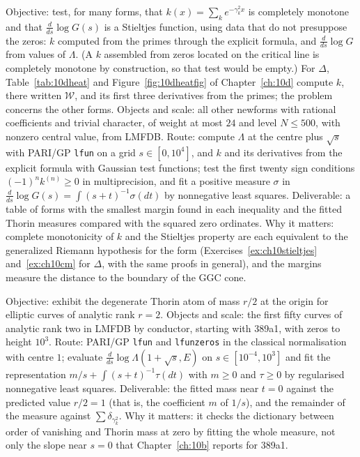 \begin{compproblem}
Objective: test, for many forms, that $k(x) = \sum_ke^{-\gamma_k^2x}$ is completely monotone and that $\frac{d}{ds}\log G(s)$ is a Stieltjes function, using data that do not presuppose the zeros: $k$ computed from the primes through the explicit formula, and $\frac{d}{ds}\log G$ from values of $\Lambda$. (A $k$ assembled from zeros located on the critical line is completely monotone by construction, so that test would be empty.) For $\Delta$, Table~\ref{tab:10dheat} and Figure~\ref{fig:10dheatfig} of Chapter~\ref{ch:10d} compute $k$, there written $\mathcal W$, and its first three derivatives from the primes; the problem concerns the other forms. Objects and scale: all other newforms with rational coefficients and trivial character, of weight at most $24$ and level $N\le500$, with nonzero central value, from LMFDB. Route: compute $\Lambda$ at the centre plus $\sqrt s$ with PARI/GP \texttt{lfun} on a grid $s\in[0,10^4]$, and $k$ and its derivatives from the explicit formula with Gaussian test functions; test the first twenty sign conditions $(-1)^nk^{(n)}\ge0$ in multiprecision, and fit a positive measure $\sigma$ in $\frac{d}{ds}\log G(s) = \int(s+t)^{-1}\sigma(dt)$ by nonnegative least squares. Deliverable: a table of forms with the smallest margin found in each inequality and the fitted Thorin measures compared with the squared zero ordinates. Why it matters: complete monotonicity of $k$ and the Stieltjes property are each equivalent to the generalized Riemann hypothesis for the form (Exercises~\ref{ex:ch10stieltjes} and~\ref{ex:ch10cm} for $\Delta$, with the same proofs in general), and the margins measure the distance to the boundary of the GGC cone.
\end{compproblem}

\begin{compproblem}
Objective: exhibit the degenerate Thorin atom of mass $r/2$ at the origin for elliptic curves of analytic rank $r=2$. Objects and scale: the first fifty curves of analytic rank two in LMFDB by conductor, starting with 389a1, with zeros to height $10^3$. Route: PARI/GP \texttt{lfun} and \texttt{lfunzeros} in the classical normalisation with centre $1$; evaluate $\frac{d}{ds}\log\Lambda(1+\sqrt s,E)$ on $s\in[10^{-4},10^3]$ and fit the representation $m/s+\int(s+t)^{-1}\tau(dt)$ with $m\ge0$ and $\tau\ge0$ by regularised nonnegative least squares. Deliverable: the fitted mass near $t=0$ against the predicted value $r/2 = 1$ (that is, the coefficient $m$ of $1/s$), and the remainder of the measure against $\sum\delta_{\gamma_k^2}$. Why it matters: it checks the dictionary between order of vanishing and Thorin mass at zero by fitting the whole measure, not only the slope near $s=0$ that Chapter~\ref{ch:10b} reports for 389a1.
\end{compproblem}

